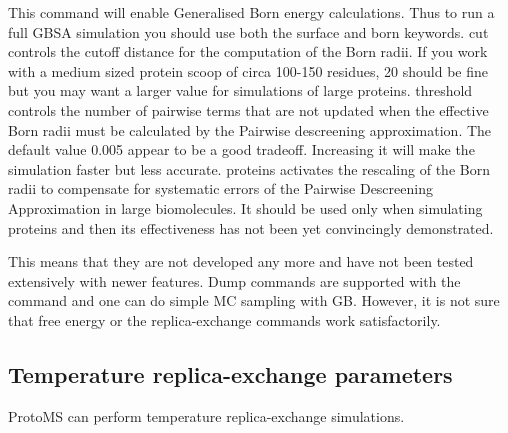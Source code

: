 \documentclass[letterpaper,10pt,english]{sphinxmanual}
\begin{document}
\ignorespaces 
\def\sphinxLiteralBlockLabel{\label{\detokenize{protoms:index-43}}}
%
\begin{sphinxVerbatim}[commandchars=\\\{\}]
     
\end{sphinxVerbatim}

This command will enable Generalised Born energy calculations. Thus to run a full GBSA simulation you should use both the surface and born keywords. cut controls the cutoff distance for the computation of the Born radii. If you work with a medium sized protein scoop of circa 100-150 residues, 20 should be fine but you may want a larger value for simulations of large proteins. threshold controls the number of pairwise terms that are not updated when the effective Born radii must be calculated by the Pairwise descreening approximation. The default value
0.005 appear to be a good tradeoff. Increasing it will make the simulation faster but less accurate. proteins activates the rescaling of the Born radii to compensate for systematic errors of the Pairwise Descreening Approximation in large biomolecules. It should be used only when simulating proteins and then its effectiveness has not been yet
convincingly demonstrated.

 This means that they are not developed any more and have not been tested extensively with newer features. Dump commands are supported with the  command and one can do simple MC sampling with GB. However, it is not sure that free energy or the replica-exchange commands work satisfactorily.


\subsection{Temperature replica-exchange parameters}
\label{\detokenize{protoms:temperature-replica-exchange-parameters}}
ProtoMS can perform temperature replica-exchange simulations.

\ignorespaces 
\def\sphinxLiteralBlockLabel{\label{\detokenize{protoms:index-44}}}
%
\begin{sphinxVerbatim}[commandchars=\\\{\}]
    
\end{sphinxVerbatim}
\end{document}
